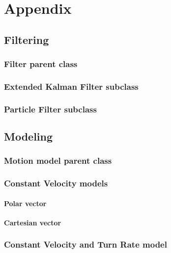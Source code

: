 \chapter{Appendix}
\section{Filtering}


\subsection{Filter parent class}



\subsection{Extended Kalman Filter subclass}


\subsection{Particle Filter subclass}



\section{Modeling}
\subsection{Motion model parent class}

\subsection{Constant Velocity models}
\subsubsection{Polar \boatspeed vector}

\subsubsection{Cartesian \boatspeed vector}

\subsection{Constant Velocity and Turn Rate model}
